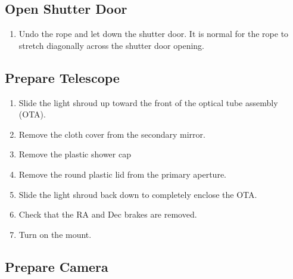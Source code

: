 \documentclass{article}
\begin{document}
		\subsection{Open Shutter Door}
			
			\begin{enumerate}
				
				\item Undo the rope and let down the shutter door. It is normal for the rope to stretch diagonally across the shutter door opening.
				
			\end{enumerate}
		
		\subsection{Prepare Telescope}
		
			\begin{enumerate}
				
				\item Slide the light shroud up toward the front of the optical tube assembly (OTA).
			
				\item Remove the cloth cover from the secondary mirror.
			
				\item Remove the plastic shower cap 
			
				\item Remove the round plastic lid from the primary aperture.
			
				\item Slide the light shroud back down to completely enclose the OTA.
	
				\item Check that the RA and Dec brakes are removed.
			
				\item Turn on the mount.
				
			\end{enumerate}
		
		\subsection{Prepare Camera}
		
\end{document}
